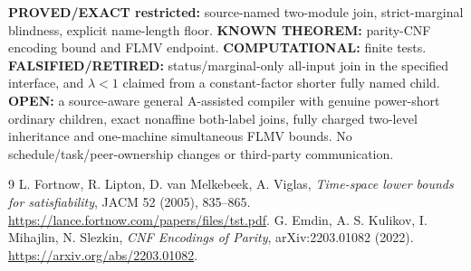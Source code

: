 \documentclass[11pt]{article}
\begin{document}
\textbf{PROVED/EXACT restricted:} source-named two-module join, strict-marginal blindness, explicit name-length floor. \textbf{KNOWN THEOREM:} parity-CNF encoding bound and FLMV endpoint. \textbf{COMPUTATIONAL:} finite tests. \textbf{FALSIFIED/RETIRED:} status/marginal-only all-input join in the specified interface, and $\lambda<1$ claimed from a constant-factor shorter fully named child. \textbf{OPEN:} a source-aware general A-assisted compiler with genuine power-short ordinary children, exact nonaffine both-label joins, fully charged two-level inheritance and one-machine simultaneous FLMV bounds. No schedule/task/peer-ownership changes or third-party communication.
\begin{thebibliography}{9}
 L. Fortnow, R. Lipton, D. van Melkebeek, A. Viglas, \emph{Time-space lower bounds for satisfiability}, JACM 52 (2005), 835--865. \url{https://lance.fortnow.com/papers/files/tst.pdf}.
 G. Emdin, A. S. Kulikov, I. Mihajlin, N. Slezkin, \emph{CNF Encodings of Parity}, arXiv:2203.01082 (2022). \url{https://arxiv.org/abs/2203.01082}.
\end{thebibliography}
\end{document}
